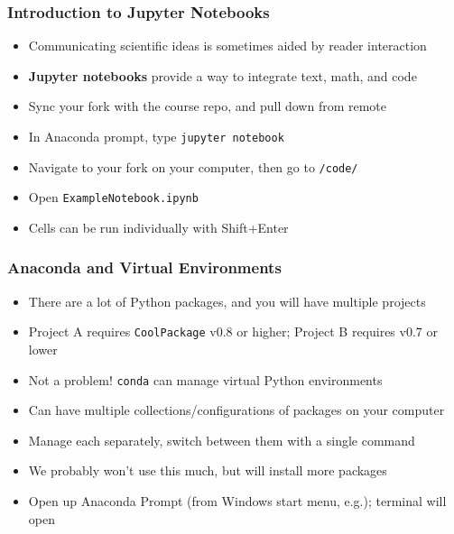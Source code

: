 \documentclass[aspectratio=169]{beamer}
\begin{document}

\begin{frame}
\frametitle{Introduction to Jupyter Notebooks}
\begin{itemize}
	\item Communicating scientific ideas is sometimes aided by reader interaction
	
	\item \textbf{Jupyter notebooks} provide a way to integrate text, math, and code
	
	\item <2->Sync your fork with the course repo, and pull down from remote
	
	\item <3->In Anaconda prompt, type \texttt{jupyter notebook}
	
	\item <3->Navigate to your fork on your computer, then go to \texttt{/code/}
	
	\item <3->Open \texttt{ExampleNotebook.ipynb}
	
	\item <4->Cells can be run individually with Shift+Enter
\end{itemize}
\end{frame}


\begin{frame}
\frametitle{Anaconda and Virtual Environments}
\begin{itemize}
	\item There are a lot of Python packages, and you will have multiple projects
	
	\item Project A requires \texttt{CoolPackage} v0.8 or higher; Project B requires v0.7 or lower
	
	\item <2->Not a problem! \texttt{conda} can manage virtual Python environments
	
	\item <2->Can have multiple collections/configurations of packages on your computer
	
	\item <2->Manage each separately, switch between them with a single command
	
	\item <3->We probably won't use this much, but will install more packages
	
	\item <3->Open up Anaconda Prompt (from Windows start menu, e.g.); terminal will open
\end{itemize}
\end{frame}
\end{document}
